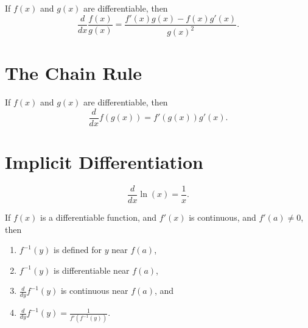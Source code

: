 \documentclass{ximera}
\newcommand{\dd}[2][]{\frac{d #1}{d #2}}
\newcommand{\ddx}{\frac{d}{dx}}
\begin{document}
\begin{theorem}\label{theorem:quotient-rule}
If $f(x)$ and $g(x)$ are differentiable, then
\[
\ddx \frac{f(x)}{g(x)} = \frac{f'(x)g(x)-f(x)g'(x)}{g(x)^2}.
\]
\end{theorem}








\section*{The Chain Rule}






\begin{theorem}
If $f(x)$ and $g(x)$ are differentiable, then
\[
\ddx f(g(x)) = f'(g(x))g'(x).
\]
\end{theorem}







\section*{Implicit Differentiation}






\begin{theorem}
\[
\ddx \ln(x) = \frac{1}{x}.
\]
\end{theorem}



\begin{theorem}\label{theorem:IFT}
If $f(x)$ is a differentiable function, and $f'(x)$ is continuous, and
$f'(a) \neq 0$, then
\begin{enumerate}
\item $f^{-1}(y)$ is defined for $y$ near $f(a)$,
\item $f^{-1}(y)$ is differentiable near $f(a)$,
\item $\dd{y} f^{-1}(y)$ is continuous near $f(a)$, and
\item $\dd{y} f^{-1}(y) = \displaystyle\frac{1}{f'(f^{-1}(y))}$.
\end{enumerate}
\end{theorem}
\end{document}

